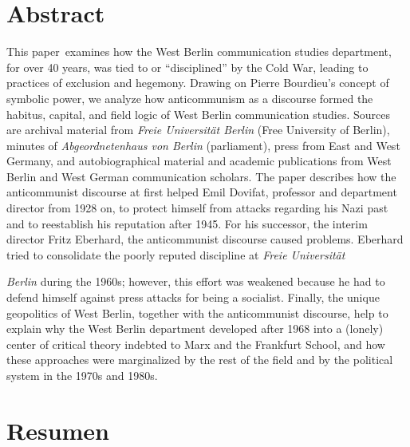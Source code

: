\documentclass{tufte-handout}
\begin{document}
\begin{titlepage}
\begin{fullwidth}
\end{fullwidth}

\vspace*{1em}

\hypertarget{abstract}{%
\section{Abstract}\label{abstract}}

This paper examines how the West Berlin communication studies department, for over 40 years, was tied to or ``disciplined'' by the Cold War, leading to practices of exclusion and hegemony. Drawing on Pierre Bourdieu's concept of symbolic power, we analyze how anticommunism as a discourse formed the habitus, capital, and field logic of West Berlin communication studies. Sources are archival material from \emph{Freie Universität Berlin} (Free University of Berlin), minutes of \emph{Abgeordnetenhaus von Berlin} (parliament), press from East and West Germany, and autobiographical material and academic publications from West Berlin and West German communication scholars. The paper describes how the anticommunist discourse at first helped Emil Dovifat, professor and department director from 1928 on, to protect himself from attacks regarding his Nazi past and to reestablish his reputation after 1945. For his successor, the interim director Fritz Eberhard, the anticommunist discourse caused problems. Eberhard tried to consolidate the poorly reputed discipline at \emph{Freie Universität} 


\enlargethispage{2\baselineskip}

\vspace*{2em}


\end{titlepage}

\noindent \emph{Berlin} during the 1960s; however, this effort was weakened because he had to defend himself against press attacks for being a socialist. Finally, the unique geopolitics of West Berlin, together with the anticommunist discourse, help to explain why the West Berlin department developed after 1968 into a (lonely) center of critical theory indebted to Marx and the Frankfurt School, and how these approaches were marginalized by the rest of the field and by the political system in the 1970s and 1980s.

\hypertarget{resumen}{%
\section{Resumen}\label{resumen}}
\end{document}
